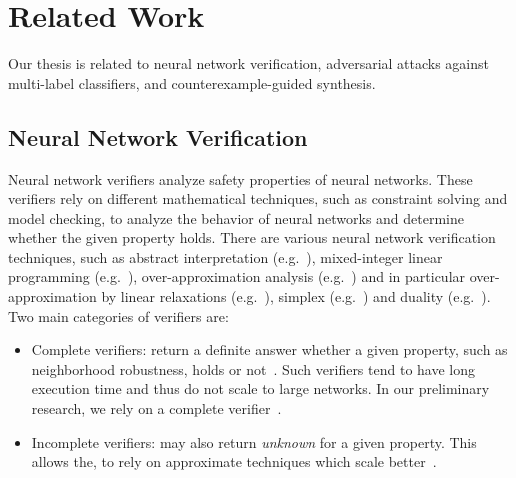 
\section{Related Work}
Our thesis is related to neural network verification, adversarial attacks against multi-label classifiers, and counterexample-guided synthesis.

\subsection{Neural Network Verification}\label{subsec:verifiers}
Neural network verifiers analyze safety properties of neural networks.
These verifiers rely on different mathematical techniques, such as constraint solving and model checking, to analyze the behavior of neural networks and determine whether the given property holds.
There are various neural network verification techniques, such as abstract interpretation (e.g.~\cite{ABSTRACTINTER, INCOMPLETE1}), mixed-integer linear programming (e.g.~\cite{MIPVERIFY, singh2018robustness, lazarus2022mixed}), over-approximation analysis (e.g.~\cite{qin2019verification, overapprox, NEURIPS2018_2ecd2bd9}) and in particular over-approximation by linear relaxations (e.g.~\cite{NEURIPS2021_fac7fead, Boopathy_Weng_Chen_Liu_Daniel_2019, 8418593, NEURIPS2019_0a9fdbb1, NEURIPS2019_246a3c55, linearOverapprox, MLSYS2021_ca46c1b9}), simplex (e.g.~\cite{Reluplex, Marabou, simplex-based}) and duality (e.g.~\cite{raghunathan2020certified, dvijotham2018dual}).
Two main categories of verifiers are:
\begin{itemize}
    \item Complete verifiers: return a definite answer whether a given property, such as neighborhood robustness, holds or not~\cite{MIPVERIFY, COMPLETE}.
    Such verifiers tend to have long execution time and thus do not scale to large networks.
        In our preliminary research, we rely on a complete verifier~\cite{MIPVERIFY}.
    \item Incomplete verifiers: may also return \emph{unknown} for a given property.
    This allows the, to rely on approximate techniques which scale better~\cite{INCOMPLETE1, INCOMPLETE2}.
\end{itemize}

